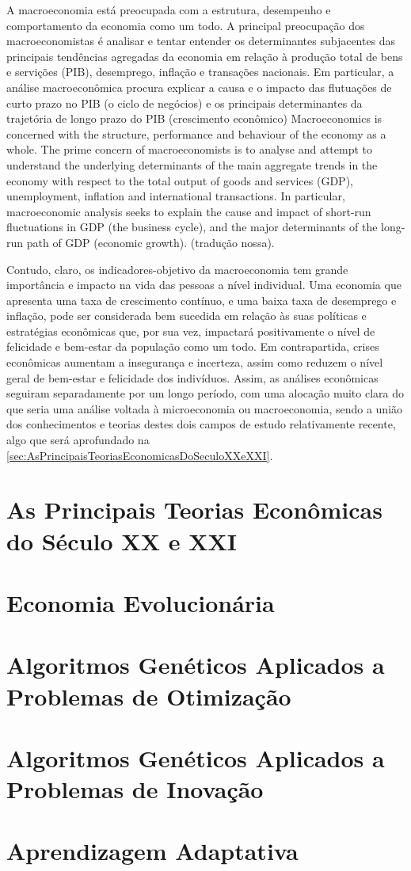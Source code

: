\citacao
	{%
		A macroeconomia está preocupada com a estrutura, desempenho e comportamento da economia como um todo. A principal preocupação dos macroeconomistas é analisar e tentar entender os determinantes subjacentes das principais tendências agregadas da economia em relação à produção total de bens e servições (PIB), desemprego, inflação e transações nacionais. Em particular, a análise macroeconômica procura explicar a causa e o impacto das flutuações de curto prazo no PIB (o ciclo de negócios) e os principais determinantes da trajetória de longo prazo do PIB (crescimento econômico)
	}{%
		Macroeconomics is concerned with the structure, performance and behaviour of the economy as a whole. The prime concern of macroeconomists is to analyse and attempt to understand the underlying determinants of the main aggregate trends in the economy with respect to the total output of goods and services (GDP), unemployment, inflation and international transactions. In particular, macroeconomic analysis seeks to explain the cause and impact of short-run fluctuations in GDP (the business cycle), and the major determinants of the long-run path of GDP (economic growth).
	}
	{\citep[pg.1]{snowdon_modern_2005}}
	{(tradução nossa).}

Contudo, claro, os indicadores-objetivo da macroeconomia tem grande importância e impacto na vida das pessoas a nível individual. Uma economia que apresenta uma taxa de crescimento contínuo, e uma baixa taxa de desemprego e inflação, pode ser considerada bem sucedida em relação às suas políticas e estratégias econômicas que, por sua vez, impactará positivamente o nível de felicidade e bem-estar da população como um todo. Em contrapartida, crises econômicas aumentam a insegurança e incerteza, assim como reduzem o nível geral de bem-estar e felicidade dos indivíduos. Assim, as análises econômicas seguiram separadamente por um longo período, com uma alocação muito clara do que seria uma análise voltada à microeconomia ou macroeconomia, sendo a união dos conhecimentos e teorias destes dois campos de estudo relativamente recente, algo que será aprofundado na \autoref{sec:AsPrincipaisTeoriasEconomicasDoSeculoXXeXXI}.

\section{As Principais Teorias Econômicas do Século XX e XXI}
\label{sec:AsPrincipaisTeoriasEconomicasDoSeculoXXeXXI}

\section{Economia Evolucionária}

\section{Algoritmos Genéticos Aplicados a Problemas de Otimização}

\section{Algoritmos Genéticos Aplicados a Problemas de Inovação}

\section{Aprendizagem Adaptativa}

